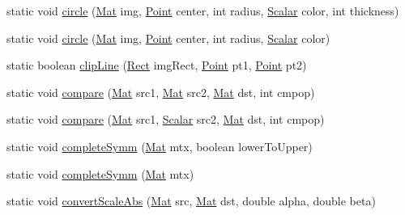 \begin{DoxyCompactItemize}
\item 
static void \mbox{\hyperlink{classorg_1_1opencv_1_1core_1_1_core_a205ea116055f6a84cc6c9d0409df0adc}{circle}} (\mbox{\hyperlink{classorg_1_1opencv_1_1core_1_1_mat}{Mat}} img, \mbox{\hyperlink{classorg_1_1opencv_1_1core_1_1_point}{Point}} center, int radius, \mbox{\hyperlink{classorg_1_1opencv_1_1core_1_1_scalar}{Scalar}} color, int thickness)
\item 
static void \mbox{\hyperlink{classorg_1_1opencv_1_1core_1_1_core_a55df53a3f36b33188cb2e5cfa385ffbc}{circle}} (\mbox{\hyperlink{classorg_1_1opencv_1_1core_1_1_mat}{Mat}} img, \mbox{\hyperlink{classorg_1_1opencv_1_1core_1_1_point}{Point}} center, int radius, \mbox{\hyperlink{classorg_1_1opencv_1_1core_1_1_scalar}{Scalar}} color)
\item 
static boolean \mbox{\hyperlink{classorg_1_1opencv_1_1core_1_1_core_a73c128fa46a560c0e998791dd5cf890a}{clip\+Line}} (\mbox{\hyperlink{classorg_1_1opencv_1_1core_1_1_rect}{Rect}} img\+Rect, \mbox{\hyperlink{classorg_1_1opencv_1_1core_1_1_point}{Point}} pt1, \mbox{\hyperlink{classorg_1_1opencv_1_1core_1_1_point}{Point}} pt2)
\item 
static void \mbox{\hyperlink{classorg_1_1opencv_1_1core_1_1_core_a6f1dc64655b7da1219d82f809efb7e16}{compare}} (\mbox{\hyperlink{classorg_1_1opencv_1_1core_1_1_mat}{Mat}} src1, \mbox{\hyperlink{classorg_1_1opencv_1_1core_1_1_mat}{Mat}} src2, \mbox{\hyperlink{classorg_1_1opencv_1_1core_1_1_mat}{Mat}} dst, int cmpop)
\item 
static void \mbox{\hyperlink{classorg_1_1opencv_1_1core_1_1_core_ab8d00dae0089e28d72949594e63ccc18}{compare}} (\mbox{\hyperlink{classorg_1_1opencv_1_1core_1_1_mat}{Mat}} src1, \mbox{\hyperlink{classorg_1_1opencv_1_1core_1_1_scalar}{Scalar}} src2, \mbox{\hyperlink{classorg_1_1opencv_1_1core_1_1_mat}{Mat}} dst, int cmpop)
\item 
static void \mbox{\hyperlink{classorg_1_1opencv_1_1core_1_1_core_ad3a0199c2b0bbc9d254768b566fd257e}{complete\+Symm}} (\mbox{\hyperlink{classorg_1_1opencv_1_1core_1_1_mat}{Mat}} mtx, boolean lower\+To\+Upper)
\item 
static void \mbox{\hyperlink{classorg_1_1opencv_1_1core_1_1_core_a57f226ca886a32a25619bd0eb17df076}{complete\+Symm}} (\mbox{\hyperlink{classorg_1_1opencv_1_1core_1_1_mat}{Mat}} mtx)
\item 
static void \mbox{\hyperlink{classorg_1_1opencv_1_1core_1_1_core_a42f107c63200e26f87ddb11631980be7}{convert\+Scale\+Abs}} (\mbox{\hyperlink{classorg_1_1opencv_1_1core_1_1_mat}{Mat}} src, \mbox{\hyperlink{classorg_1_1opencv_1_1core_1_1_mat}{Mat}} dst, double alpha, double beta)

\end{DoxyCompactItemize}
